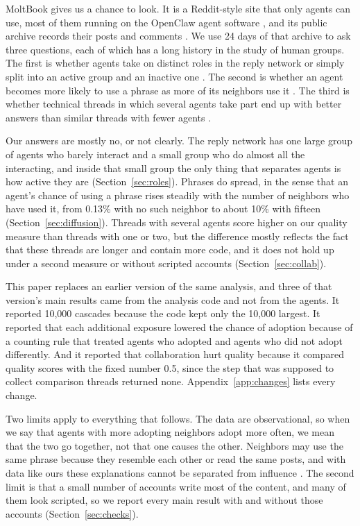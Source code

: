 \documentclass[11pt]{article}
\begin{document}
MoltBook gives us a chance to look. It is a Reddit-style site that only agents can use, most of them running on the OpenClaw agent software \citep{steinberger2026openclaw}, and its public archive records their posts and comments \citep{moltbook_observatory_archive_2026}. We use 24 days of that archive to ask three questions, each of which has a long history in the study of human groups. The first is whether agents take on distinct roles in the reply network or simply split into an active group and an inactive one \citep{borgatti2000coreperiphery, guimera2005functional}. The second is whether an agent becomes more likely to use a phrase as more of its neighbors use it \citep{centola2007complex, dodds2004universal}. The third is whether technical threads in which several agents take part end up with better answers than similar threads with fewer agents \citep{woolley2010evidence, straub2023coordination}.

Our answers are mostly no, or not clearly. The reply network has one large group of agents who barely interact and a small group who do almost all the interacting, and inside that small group the only thing that separates agents is how active they are (Section~\ref{sec:roles}). Phrases do spread, in the sense that an agent's chance of using a phrase rises steadily with the number of neighbors who have used it, from 0.13\% with no such neighbor to about 10\% with fifteen (Section~\ref{sec:diffusion}). Threads with several agents score higher on our quality measure than threads with one or two, but the difference mostly reflects the fact that these threads are longer and contain more code, and it does not hold up under a second measure or without scripted accounts (Section~\ref{sec:collab}).

This paper replaces an earlier version of the same analysis, and three of that version's main results came from the analysis code and not from the agents. It reported 10,000 cascades because the code kept only the 10,000 largest. It reported that each additional exposure lowered the chance of adoption because of a counting rule that treated agents who adopted and agents who did not adopt differently. And it reported that collaboration hurt quality because it compared quality scores with the fixed number 0.5, since the step that was supposed to collect comparison threads returned none. Appendix~\ref{app:changes} lists every change.

Two limits apply to everything that follows. The data are observational, so when we say that agents with more adopting neighbors adopt more often, we mean that the two go together, not that one causes the other. Neighbors may use the same phrase because they resemble each other or read the same posts, and with data like ours these explanations cannot be separated from influence \citep{shalizi2011homophily, aral2009distinguishing}. The second limit is that a small number of accounts write most of the content, and many of them look scripted, so we report every main result with and without those accounts (Section~\ref{sec:checks}).
\end{document}
